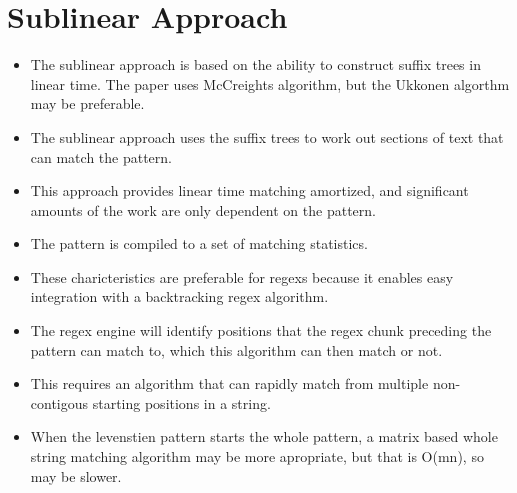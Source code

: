 \section{Sublinear Approach}
\label{sec:sublinear}

\begin{itemize}
	\item The sublinear approach is based on the ability to construct suffix trees in linear time. The paper uses McCreights algorithm, but the Ukkonen algorthm may be preferable.
	\item The sublinear approach uses the suffix trees to work out sections of text that can match the pattern.
	\item This approach provides linear time matching amortized, and significant amounts of the work are only dependent on the pattern.
	\item The pattern is compiled to a set of matching statistics.
	\item These charicteristics are preferable for regexs because it enables easy integration with a backtracking regex algorithm.
	\item The regex engine will identify positions that the regex chunk preceding the pattern can match to, which this algorithm can then match or not.
	\item This requires an algorithm that can rapidly match from multiple non-contigous starting positions in a string.
	\item When the levenstien pattern starts the whole pattern, a matrix based whole string matching algorithm may be more apropriate, but that is O(mn), so may be slower.
\end{itemize}
\cite{Chang1994}
